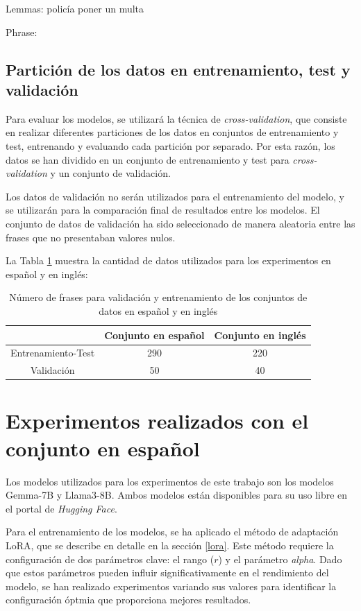 \documentclass[11pt,spanish,listoffigures,listoftables]{tfgetsinf}
\begin{document}
\begin{displayquote}
Lemmas: policía poner un multa

Phrase:
\end{displayquote}

\subsection{Partición de los datos en entrenamiento, test y validación}

Para evaluar los modelos, se utilizará la técnica de \textit{cross-validation}, que consiste en realizar diferentes particiones de los datos en conjuntos de entrenamiento y test, entrenando y evaluando cada partición por separado. Por esta razón, los datos se han dividido en un conjunto de entrenamiento y test para \textit{cross-validation} y un conjunto de validación.

Los datos de validación no serán utilizados para el entrenamiento del modelo, y se utilizarán para la comparación final de resultados entre los modelos. El conjunto de datos de validación ha sido seleccionado de manera aleatoria entre las frases que no presentaban valores nulos.

La Tabla \ref{tab:frases} muestra la cantidad de datos utilizados para los experimentos en español y en inglés:

\begin{table}[!h]
\caption{Número de frases para validación y entrenamiento de los conjuntos de datos en español y en inglés}
\begin{center}
\begin{tabular}{  c || c  c  }
	\ & Conjunto en español & Conjunto en inglés \\
	\hline
	Entrenamiento-Test & 290 & 220 \\
	Validación & 50 & 40
\end{tabular}
\end{center}
\label{tab:frases}
\end{table}

\section{Experimentos realizados con el conjunto en español}

Los modelos utilizados para los experimentos de este trabajo son los modelos Gemma-7B y Llama3-8B. Ambos modelos están disponibles para su uso libre en el portal de \textit{Hugging Face}.

Para el entrenamiento de los modelos, se ha  aplicado el método de adaptación LoRA, que se describe en detalle en la sección \ref{lora}. Este método requiere la configuración de dos parámetros clave: el rango ($r$) y el parámetro \textit{alpha}. Dado que estos parámetros pueden influir significativamente en el rendimiento del modelo, se han realizado experimentos variando sus valores para identificar la configuración óptmia que proporciona mejores resultados.
\end{document}
